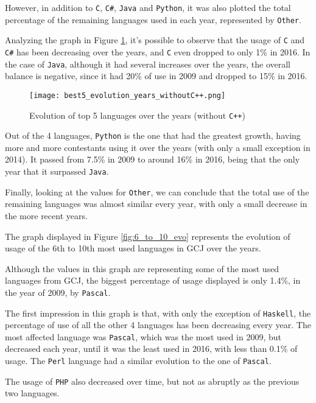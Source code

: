 \documentclass{article}
\begin{document}
\begin{multicols*}{2}
However, in addition to \texttt{C}, \texttt{C\#}, \texttt{Java} and \texttt{Python}, it was also plotted the total percentage of the remaining languages used in each year, represented by \texttt{Other}.


Analyzing the graph in Figure \ref{fig:top5_evo}, it's possible to observe that the usage of \texttt{C} and \texttt{C\#} has been decreasing over the years, and \texttt{C} even dropped to only 1\% in 2016.
In the case of \texttt{Java}, although it had several increases over the years, the overall balance is negative, since it had 20\% of use in 2009 and dropped to 15\% in 2016.

\begin{figure}[H]
    \centering
    \texttt{[image: best5\_evolution\_years\_withoutC++.png]}
    \caption{Evolution of top 5 languages over the years (without \texttt{C++})}
    \label{fig:top5_evo}
\end{figure}

Out of the 4 languages, \texttt{Python} is the one that had the greatest growth, having more and more contestants using it over the years (with only a small exception in 2014). It passed from 7.5\% in 2009 to around 16\% in 2016, being that the only year that it surpassed \texttt{Java}.

Finally, looking at the values for \texttt{Other}, we can conclude that the total use of the remaining languages was almost similar every year, with only a small decrease in the more recent years.


The graph displayed in Figure \ref{fig:6_to_10_evo} represents the evolution of usage of the 6th to 10th most used languages in GCJ over the years.


Although the values in this graph are representing some of the most used languages from GCJ, the biggest percentage of usage displayed is only 1.4\%, in the year of 2009, by \texttt{Pascal}.




The first impression in this graph is that, with only the exception of \texttt{Haskell}, the percentage of use of all the other 4 languages has been decreasing every year. The most affected language was \texttt{Pascal}, which was the most used in 2009, but decreased each year, until it was the least used in 2016, with less than 0.1\% of usage. The \texttt{Perl} language had a similar evolution to the one of \texttt{Pascal}.

The usage of \texttt{PHP} also decreased over time, but not as abruptly as the previous two languages.


\end{multicols*}
\end{document}
